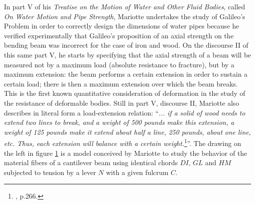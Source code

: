 In part V of his \emph{Treatise on the Motion of Water and Other Fluid Bodies}, called \emph{On Water Motion and Pipe Strength}, Mariotte undertakes the study of Galileo's Problem in order to correctly design the dimensions of water pipes because he verified experimentally that Galileo's proposition of an axial strength on the bending beam was incorrect for the case of iron and wood. On the discourse II of this same part V, he starts by specifying that the axial strength of a beam will be measured not by a maximum load (absolute resistance to fracture), but by a maximum extension: the beam performs a certain extension in order to sustain a certain load; there is then a maximum extension over which the beam breaks. This is the first known quantitative consideration of deformation in the study of the resistance of deformable bodies. Still in part V, discourse II, Mariotte also describes in literal form a load-extension relation: ``\emph{... if a solid of wood needs to extend two lines to break, and a weight of 500 pounds make this extension, a weight of 125 pounds make it extend about half a line, 250 pounds, about one line, etc. Thus, each extension will balance with a certain weight.}\footnote{\cite{benvenuto_1991}, p.266.}''. The drawing on the left in figure \ref{fg:mariotte} is a model conceived by Mariotte to study the behavior of the material fibers of a cantilever beam using identical chords $DI$, $GL$ and $HM$ subjected to tension by a lever $N$ with a given fulcrum $C$.     
\begin{figure}[!ht]
	\centering
	\begin{center}
	\end{center}
	\label{fg:mariotte}
\end{figure}
